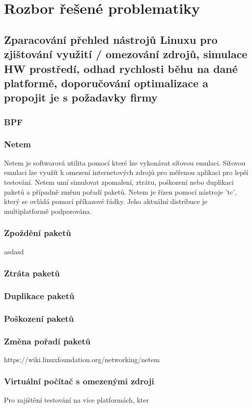 \chapter{Rozbor řešené problematiky}

\section{Zparacování přehled nástrojů Linuxu pro zjištování využití / omezování zdrojů, simulace HW prostředí, odhad rychlosti běhu na dané platformě, doporučování optimalizace a propojit je s požadavky firmy}

\subsection{BPF}

\subsection{Netem}
Netem je softwarová utilita pomocí které lze vykonávat síťovou emulaci. Síťovou emulaci lze využít k omezení internetových zdrojů pro měřenou aplikaci pro lepší testování.
Netem umí simulovat zpomalení, ztrátu, poškození nebo duplikaci paketů a případně změnu pořadí paketů. Netem je řízen pomocí nástroje 'tc', který se ovládá pomocí příkazové řádky.
Jeho aktuální distribuce je multiplatformě podporována.

\subsection*{Zpoždění paketů}
asdasd

\subsection*{Ztráta paketů}

\subsection*{Duplikace paketů}

\subsection*{Poškození paketů}

\subsection*{Změna pořadí paketů}

https://wiki.linuxfoundation.org/networking/netem

\subsection{Virtuální počítač s omezenými zdroji}

Pro zajištění testování na více platformách, kter
